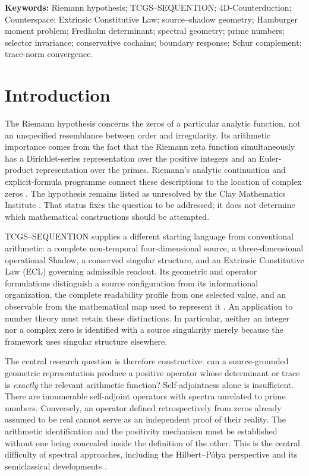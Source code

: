 \documentclass[11pt,letterpaper]{article}
\numberwithin{equation}{section}
\theoremstyle{definition}
\theoremstyle{remark}
\begin{document}
\begin{samepage}
{\small \noindent\textbf{Keywords:} Riemann hypothesis; TCGS--SEQUENTION; 4D-Counterduction; Counterspace; Extrinsic Constitutive Law; source--shadow geometry; Hamburger moment problem; Fredholm determinant; spectral geometry; prime numbers; selector invariance; conservative cochains; boundary response; Schur complement; trace-norm convergence.\par}
\end{samepage}

\section{Introduction}
\label{sec:introduction}
The Riemann hypothesis concerns the zeros of a particular analytic function, not an unspecified resemblance between order and irregularity. Its arithmetic importance comes from the fact that the Riemann zeta function simultaneously has a Dirichlet-series representation over the positive integers and an Euler-product representation over the primes. Riemann's analytic continuation and explicit-formula programme connect these descriptions to the location of complex zeros \cite{riemann,titchmarsh}. The hypothesis remains listed as unresolved by the Clay Mathematics Institute \cite{clay}. That status fixes the question to be addressed; it does not determine which mathematical constructions should be attempted.

TCGS--SEQUENTION supplies a different starting language from conventional arithmetic: a complete non-temporal four-dimensional source, a three-dimensional operational Shadow, a conserved singular structure, and an Extrinsic Constitutive Law (ECL) governing admissible readout. Its geometric and operator formulations distinguish a source configuration from its informational organization, the complete readability profile from one selected value, and an observable from the mathematical map used to represent it \cite{tcgsfoundation,tcgsgeometry,tcgsoperator}. An application to number theory must retain these distinctions. In particular, neither an integer nor a complex zero is identified with a source singularity merely because the framework uses singular structure elsewhere.

The central research question is therefore constructive: can a source-grounded geometric representation produce a positive operator whose determinant or trace is \emph{exactly} the relevant arithmetic function? Self-adjointness alone is insufficient. There are innumerable self-adjoint operators with spectra unrelated to prime numbers. Conversely, an operator defined retrospectively from zeros already assumed to be real cannot serve as an independent proof of their reality. The arithmetic identification and the positivity mechanism must be established without one being concealed inside the definition of the other. This is the central difficulty of spectral approaches, including the Hilbert--P\'olya perspective and its semiclassical developments \cite{berrykeating}.
\end{document}
